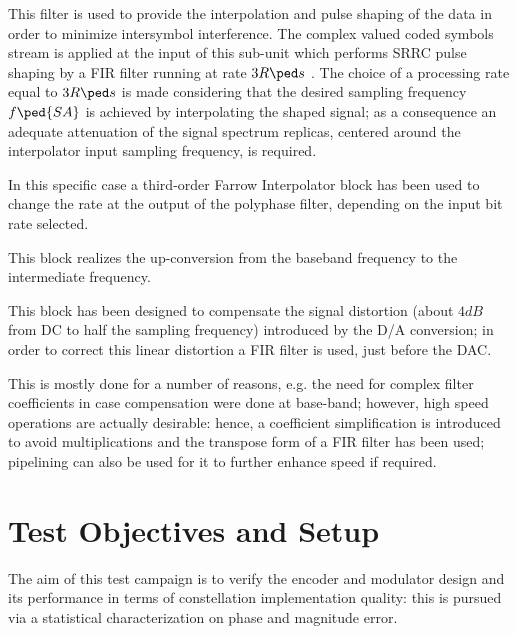 \begin{description}
    This filter is used to provide the interpolation and pulse shaping of the data in order to minimize intersymbol interference. The complex valued coded symbols stream is applied at the input of this sub-unit which performs SRRC pulse shaping by a FIR filter running at rate \(3 R\ped s\) . The choice of a processing rate equal to \(3 R\ped s\) is made considering that the desired sampling frequency  \(f\ped{SA}\) is achieved by interpolating the shaped signal; as a consequence an adequate attenuation of the signal spectrum replicas, centered around the interpolator input sampling frequency, is required.
\item[Interpolator Section] In this specific case a third-order Farrow Interpolator block has been used to change the rate at the output of the polyphase filter, depending on the input bit rate selected.

\item[Digital Up Conversion (UPC) Stage] This block realizes the up-conversion from the baseband frequency to the intermediate frequency.

\item[DAC Precompensation Filter] This block has been designed to compensate the signal distortion (about \(4\unit{dB}\) from DC to half the sampling frequency) introduced by the D/A conversion; in order to correct this linear distortion a FIR filter is used, just before the DAC.

    This is mostly done for a number of reasons, e.g. the need for complex filter coefficients in case compensation were done at base-band; however, high speed operations are actually desirable: hence, a coefficient simplification is introduced to avoid multiplications and the transpose form of a FIR filter has been used; pipelining can also be used for it to further enhance speed if required.

\end{description}

\clearpage

\section{Test Objectives and Setup}

The aim of this test campaign is to verify the encoder and modulator design and its performance in terms of constellation implementation quality: this is pursued via a statistical characterization on phase and magnitude error.

